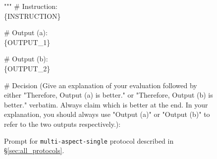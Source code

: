 \begin{figure*}[t!]
\begin{tcolorbox}

"""
\newline
\# Instruction: \\
\{INSTRUCTION\}
\newline

\# Output (a):\\
\{OUTPUT\_1\}
\newline

\# Output (b):\\
\{OUTPUT\_2\}
\newline

\# Decision (Give an explanation of your evaluation followed by either "Therefore, Output (a) is better." or "Therefore, Output (b) is better." verbatim. Always claim which is better at the end. In your explanation, you should always use "Output (a)" or "Output (b)" to refer to the two outputs respectively.):
\end{tcolorbox}
\caption{Prompt for \texttt{multi-aspect-single} protocol described in \S\ref{sec:all_protocols}.}
\label{fig:prompt_multi_aspect_one}
\end{figure*}





